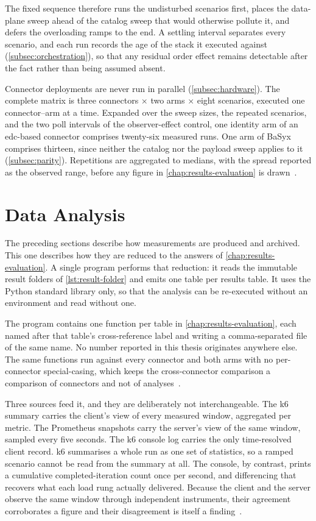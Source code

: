 The fixed sequence therefore runs the undisturbed scenarios first, places the data-plane sweep ahead of the catalog sweep that would otherwise pollute it, and defers the overloading ramps to the end. A settling interval separates every scenario, and each run records the age of the stack it executed against (\cref{subsec:orchestration}), so that any residual order effect remains detectable after the fact rather than being assumed absent.

Connector deployments are never run in parallel (\cref{subsec:hardware}). The complete matrix is three connectors $\times$ two arms $\times$ eight scenarios, executed one connector--arm at a time. Expanded over the sweep sizes, the repeated scenarios, and the two poll intervals of the observer-effect control, one identity arm of an \gls{edc}-based connector comprises twenty-six measured runs. One arm of BaSyx comprises thirteen, since neither the catalog nor the payload sweep applies to it (\cref{subsec:parity}). Repetitions are aggregated to medians, with the spread reported as the observed range, before any figure in \cref{chap:results-evaluation} is drawn~\citep{jain1991art, hoefler2015scientific}.


\section{Data Analysis}\label{sec:data-analysis}

The preceding sections describe how measurements are produced and archived. This one describes how they are reduced to the answers of \cref{chap:results-evaluation}. A single program performs that reduction: it reads the immutable result folders of \cref{lst:result-folder} and emits one table per results table. It uses the Python standard library only, so that the analysis can be re-executed without an environment and read without one.

The program contains one function per table in \cref{chap:results-evaluation}, each named after that table's cross-reference label and writing a comma-separated file of the same name. No number reported in this thesis originates anywhere else. The same functions run against every connector and both arms with no per-connector special-casing, which keeps the cross-connector comparison a comparison of connectors and not of analyses~\citep{kistowski2015benchmark}.

Three sources feed it, and they are deliberately not interchangeable. The k6 summary carries the client's view of every measured window, aggregated per metric. The Prometheus snapshots carry the server's view of the same window, sampled every five seconds. The k6 console log carries the only time-resolved client record. k6 summarises a whole run as one set of statistics, so a ramped scenario cannot be read from the summary at all. The console, by contrast, prints a cumulative completed-iteration count once per second, and differencing that recovers what each load rung actually delivered. Because the client and the server observe the same window through independent instruments, their agreement corroborates a figure and their disagreement is itself a finding~\citep{hasselbring2021benchmarking}.

